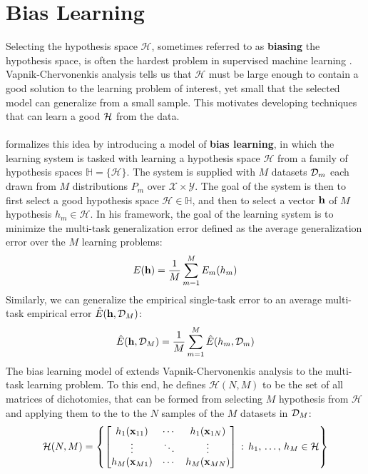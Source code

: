 \section{Bias Learning}
\label{bias_learning}
Selecting the hypothesis space $\mathcal{H}$, sometimes referred to as \textbf{biasing} the hypothesis space, is often the hardest problem in supervised machine learning \citep{baxter2000}. Vapnik-Chervonenkis analysis tells us that $\mathcal{H}$ must be large enough to contain a good solution to the learning problem of interest, yet small that the selected model can generalize from a small sample. This motivates developing techniques that can learn a good $\mathcal{H}$ from the data.
\\\\
\citet{baxter2000} formalizes this idea by introducing a model of \textbf{bias learning}, in which the learning system is tasked with learning a hypothesis space $\mathcal{H}$ from a family of hypothesis spaces $\mathbb{H} = \{\mathcal{H}\}$. The system is supplied with $M$ datasets $\mathcal{D}_m$ each drawn from $M$ distributions $P_m$ over $\mathcal{X} \times \mathcal{Y}$. The goal of the system is then to first select a good hypothesis space $\mathcal{H} \in \mathbb{H}$, and then to select a vector $\mathbf{h}$ of $M$ hypothesis $h_m \in \mathcal{H}$. In his framework, the goal of the learning system is to minimize the multi-task generalization error defined as the average generalization error over the $M$ learning problems:
$$
E(\mathbf{h}) = \frac{1}{M}\sum\limits_{m = 1}^M E_m(h_m)
$$
Similarly, we can generalize the empirical single-task error to an average multi-task empirical error $\hat{E}(\mathbf{h}, \mathcal{D}_M)$: 
$$
\hat{E}(\mathbf{h}, \mathcal{D}_M) = \frac{1}{M}\sum\limits_{m = 1}^M\hat{E}(h_m, \mathcal{D}_m)
$$
The bias learning model of \citet{baxter2000} extends Vapnik-Chervonenkis analysis to the multi-task learning problem. To this end, he defines $\mathcal{H}(N, M)$ to be the set of all matrices of dichotomies, that can be formed from selecting $M$ hypothesis from $\mathcal{H}$ and applying them to the to the $N$ samples of the $M$ datasets in $\mathcal{D}_M$:
$$
\mathcal{H}(N, M) = \left\{ \begin{bmatrix}
	h_1(\mathbf{x}_{11}) & \cdots & h_1(\mathbf{x}_{1N}) \\
	\vdots & \ddots & \vdots \\
	h_M(\mathbf{x}_{M1}) & \cdots & h_M(\mathbf{x}_{MN})
\end{bmatrix}\, :\, h_1,\, \dots,\, h_M \in \mathcal{H} \right\}
$$

